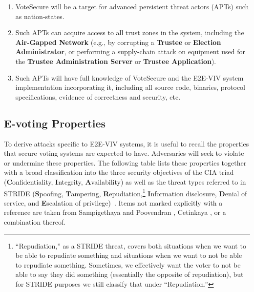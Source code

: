 \documentclass[10pt,letterpaper]{article}
\begin{document}
\begin{enumerate}

    \item VoteSecure will be a target for advanced persistent threat actors (APTs) such as nation-states.

    \item Such APTs can acquire access to all trust zones in the system, including the \textbf{Air-Gapped Network} (e.g., by corrupting a \textbf{Trustee} or \textbf{Election Administrator}, or performing a supply-chain attack on equipment used for the \textbf{Trustee Administration Server} or \textbf{Trustee Application}).

    \item Such APTs will have full knowledge of VoteSecure and the E2E-VIV system implementation incorporating it, including all source code, binaries, protocol specifications, evidence of correctness and security, etc.

\end{enumerate}

\subsection{E-voting Properties}

To derive attacks specific to E2E-VIV systems, it is useful to recall the properties that secure voting systems are expected to have. Adversaries will seek to violate or undermine these properties. The following table lists these properties together with a broad classification into the three security objectives of the CIA triad (\textbf{C}onfidentiality, \textbf{I}ntegrity, \textbf{A}vailability) as well as the threat types referred to in STRIDE (\textbf{S}poofing, \textbf{T}ampering, \textbf{R}epudiation,\footnote{\label{footnote:repudiation} ``Repudiation,'' as a STRIDE threat, covers both situations when we want to be able to repudiate something and situations when we want to not be able to repudiate something. Sometimes, we effectively want the voter to not be able to say they did something (essentially the opposite of repudiation), but for STRIDE purposes we still classify that under ``Repudiation.''} \textbf{I}nformation disclosure, \textbf{D}enial of service, and \textbf{E}scalation of privilege)~\cite{MicrosoftSecuritySTRIDEChart2007,GroeneveldMasteringSTRIDE}. Items not marked explicitly with a reference are taken from Sampigethaya and Poovendran \cite{SampigethayaPoovendranFrameworkTaxonomy2006}, Cetinkaya \cite{CetinkayaAnalysisSecurity2008}, or a combination thereof.
\end{document}
